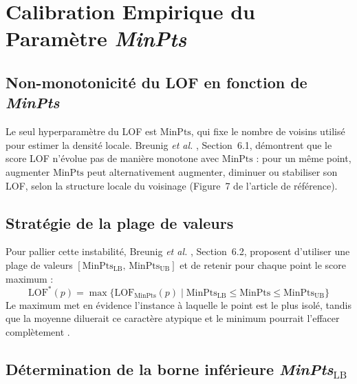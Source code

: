 \documentclass[12pt, a4paper]{article}
\begin{document}
\section{Calibration Empirique du Paramètre \textit{MinPts}}
\label{sec:calibration}

\subsection{Non-monotonicité du LOF en fonction de \textit{MinPts}}
\label{subsec:non_monotonicite}

Le seul hyperparamètre du LOF est $\text{MinPts}$, qui fixe le nombre de
voisins utilisé pour estimer la densité locale. Breunig \textit{et al.}
\cite{breunig2000lof}, Section~6.1, démontrent que le score LOF n'évolue pas
de manière monotone avec $\text{MinPts}$ : pour un même point, augmenter
$\text{MinPts}$ peut alternativement augmenter, diminuer ou stabiliser son
LOF, selon la structure locale du voisinage (Figure~7 de l'article de
référence).

\subsection{Stratégie de la plage de valeurs}
\label{subsec:plage_valeurs}

Pour pallier cette instabilité, Breunig \textit{et al.}
\cite{breunig2000lof}, Section~6.2, proposent d'utiliser une plage de valeurs
$[\text{MinPts}_\text{LB},\, \text{MinPts}_\text{UB}]$ et de retenir pour
chaque point le score maximum :
\[
    \text{LOF}^*(p) = \max \bigl\{
    \text{LOF}_{\text{MinPts}}(p) \mid
    \text{MinPts}_\text{LB} \leq \text{MinPts} \leq \text{MinPts}_\text{UB}
    \bigr\}
\]
Le maximum met en évidence l'instance à laquelle le point est le plus isolé,
tandis que la moyenne diluerait ce caractère atypique et le minimum pourrait
l'effacer complètement \cite{breunig2000lof}.

\subsection{Détermination de la borne inférieure
\textit{MinPts}$_\text{LB}$}
\label{subsec:borne_inf}
\end{document}
